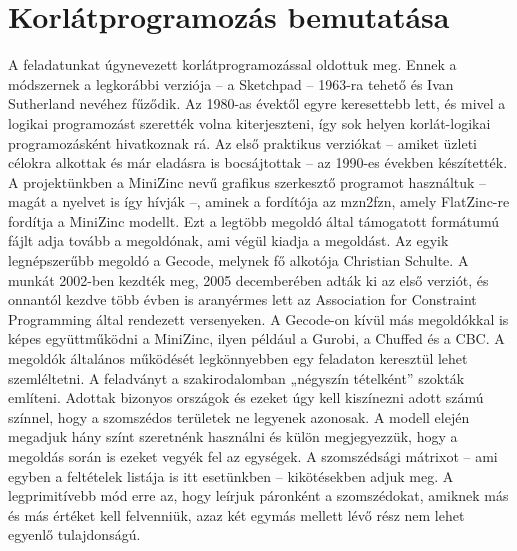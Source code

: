 \documentclass[12pt,a4paper,twoside, openright]{report}
\begin{document}
	\section{Korlátprogramozás bemutatása} 

		A feladatunkat úgynevezett korlátprogramozással oldottuk meg. Ennek a módszernek a legkorábbi verziója – a Sketchpad – 1963-ra tehető és Ivan Sutherland nevéhez fűződik\cite{sketchpad}. Az 1980-as évektől egyre keresettebb lett, és mivel a logikai programozást szerették volna kiterjeszteni, így sok helyen korlát-logikai programozásként hivatkoznak rá. Az első praktikus verziókat – amiket üzleti célokra alkottak és már eladásra is bocsájtottak – az 1990-es években készítették. 
		A projektünkben a MiniZinc nevű grafikus szerkesztő programot használtuk – magát a nyelvet is így hívják –, aminek a fordítója az mzn2fzn, amely FlatZinc-re fordítja a MiniZinc modellt. Ezt a legtöbb megoldó által támogatott formátumú fájlt adja tovább a megoldónak, ami végül kiadja a megoldást. Az egyik legnépszerűbb megoldó a Gecode, melynek fő alkotója Christian Schulte\cite{gecode}. A munkát 2002-ben kezdték meg, 2005 decemberében adták ki az első verziót, és onnantól kezdve több évben is aranyérmes lett az Association for Constraint Programming által rendezett versenyeken. A Gecode-on kívül más megoldókkal is képes együttműködni a MiniZinc, ilyen például a Gurobi, a Chuffed és a CBC.
		A megoldók általános működését legkönnyebben egy feladaton keresztül lehet szemléltetni. A feladványt a szakirodalomban „négyszín tételként” szokták említeni. Adottak bizonyos országok és ezeket úgy kell kiszínezni adott számú színnel, hogy a szomszédos területek ne legyenek azonosak.
		A modell elején megadjuk hány színt szeretnénk használni és külön megjegyezzük, hogy a megoldás során is ezeket vegyék fel az egységek. A szomszédsági mátrixot – ami egyben a feltételek listája is itt esetünkben – kikötésekben adjuk meg. A legprimitívebb mód erre az, hogy leírjuk páronként a szomszédokat, amiknek más és más értéket kell felvenniük, azaz két egymás mellett lévő rész nem lehet egyenlő tulajdonságú. 
		
	
\end{document}
